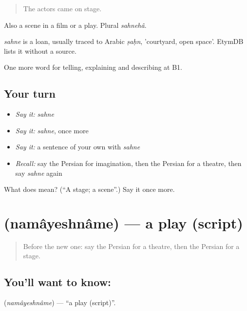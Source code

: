 \begin{quote}
The actors came on stage.
\end{quote}

Also a scene in a film or a play. Plural \emph{sahnehâ}.

\begin{cousinweb}
\emph{sahne} is a loan, usually traced to Arabic \emph{ṣaḥn}, 'courtyard, open space'. EtymDB lists it without a source.
\end{cousinweb}

\begin{grammarlens}[title={What you've built}]
One more word for telling, explaining and describing at B1.
\end{grammarlens}

\subsection*{Your turn}
\begin{itemize}
\raggedright
  \item \emph{Say it:} \emph{sahne}
  \item \emph{Say it:} \emph{sahne}, once more
  \item \emph{Say it:} a sentence of your own with \emph{sahne}
  \item \emph{Recall:} say the Persian for imagination, then the Persian for a theatre, then say \emph{sahne} again
\end{itemize}

\begin{tcolorbox}[breakable,colback=teal!4,colframe=teal!35!black,title={Before you move on}]
What does  mean? (\textquotedblleft{}A stage; a scene\textquotedblright{}.) Say it once more.
\end{tcolorbox}
\section[\texorpdfstring{\fa{نمایشنامه} (namâyeshnâme)}{نمایشنامه (namâyeshnâme)}]{ (namâyeshnâme) — a play (script)}

\label{lesson:FA-C523-namayeshname}



\begin{quote}
Before the new one: say the Persian for a theatre, then the Persian for a stage.
\end{quote}

\subsection*{You'll want to know: }
\textbf{} (\emph{namâyeshnâme}) — \textquotedblleft{}a play (script)\textquotedblright{}.

